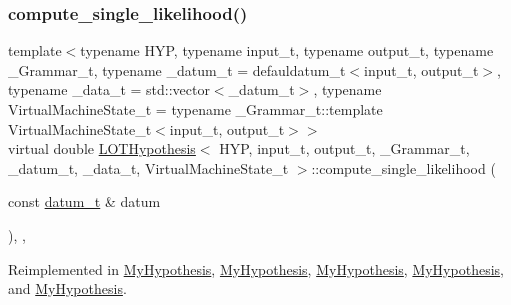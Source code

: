 \subsubsection{\texorpdfstring{compute\+\_\+single\+\_\+likelihood()}{compute\_single\_likelihood()}}
{\footnotesize\ttfamily template$<$typename H\+YP, typename input\+\_\+t, typename output\+\_\+t, typename \+\_\+\+Grammar\+\_\+t, typename \+\_\+datum\+\_\+t = defauldatum\+\_\+t$<$input\+\_\+t, output\+\_\+t$>$, typename \+\_\+data\+\_\+t = std\+::vector$<$\+\_\+datum\+\_\+t$>$, typename Virtual\+Machine\+State\+\_\+t = typename \+\_\+\+Grammar\+\_\+t\+::template Virtual\+Machine\+State\+\_\+t$<$input\+\_\+t, output\+\_\+t$>$$>$ \\
virtual double \hyperlink{class_l_o_t_hypothesis}{L\+O\+T\+Hypothesis}$<$ H\+YP, input\+\_\+t, output\+\_\+t, \+\_\+\+Grammar\+\_\+t, \+\_\+datum\+\_\+t, \+\_\+data\+\_\+t, Virtual\+Machine\+State\+\_\+t $>$\+::compute\+\_\+single\+\_\+likelihood (\begin{DoxyParamCaption}\item[{const \hyperlink{class_l_o_t_hypothesis_ae36b1f113f45ee5ac82660028672739b}{datum\+\_\+t} \&}]{datum }\end{DoxyParamCaption})\hspace{0.3cm}{\ttfamily [inline]}, {\ttfamily [override]}, {\ttfamily [virtual]}}



Reimplemented in \hyperlink{class_my_hypothesis_af2470b1e04711c06ee551deae15af4c1}{My\+Hypothesis}, \hyperlink{class_my_hypothesis_a480fc9e50d0faa0f5226f56187fd2eec}{My\+Hypothesis}, \hyperlink{class_my_hypothesis_af23a45a03a28ea4f42438e70d47acacb}{My\+Hypothesis}, \hyperlink{class_my_hypothesis_af23a45a03a28ea4f42438e70d47acacb}{My\+Hypothesis}, and \hyperlink{class_my_hypothesis_af23a45a03a28ea4f42438e70d47acacb}{My\+Hypothesis}.

\mbox{\label{class_l_o_t_hypothesis_ab24d0b8faa360f6a0edc4eefb17d6de7}} 
